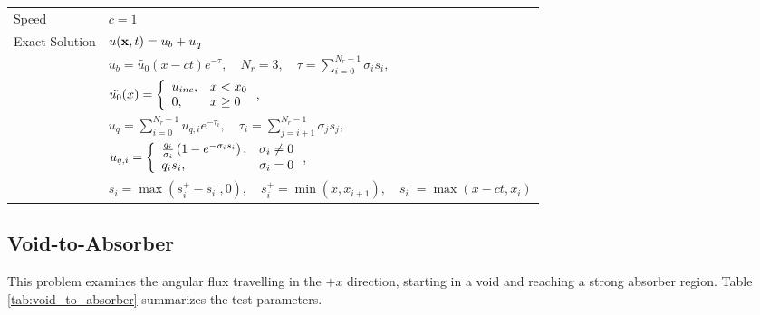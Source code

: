 \begin{table}[h]
\begin{tabular}{l l}
Speed & $c=1$\\
Exact Solution & $u(\mathbf{x},t) = u_b + u_q$\\
   & $u_b=\tilde{u_0}(x-ct)e^{-\tau},
        \quad N_r=3,\quad
        \tau = \sum\limits_{i=0}^{N_r-1} \sigma_i s_i,$\\
   & $\tilde{u_0}(x) = \left\{\begin{array}{l l}
        u_{inc}, & x<x_0\\
        0,       & x\geq 0
     \end{array}\right.$,\\
   & $u_q=\sum\limits_{i=0}^{N_r-1}u_{q,i}e^{-\tau_i},\quad
        \tau_i = \sum\limits_{j=i+1}^{N_r-1} \sigma_j s_j,$\\
   & $u_{q,i} = \left\{\begin{array}{l l}
        \frac{q_i}{\sigma_i}\left(1-e^{-\sigma_i s_i}\right), & \sigma_i\neq 0\\
        q_i s_i, & \sigma_i = 0
        \end{array}\right.$,\\
   & $s_i = \max(s^+_i-s^-_i,0),\quad
     s^+_i = \min(x,x_{i+1}),\quad
     s^-_i = \max(x-ct,x_i)$ \\
\bottomrule\end{tabular}
\end{table}
\subsection{Void-to-Absorber}\label{sec:void_to_absorber}
This problem examines the angular flux travelling in the $+x$ direction,
starting in a void and reaching a strong absorber region.
Table \ref{tab:void_to_absorber} summarizes the test parameters.

